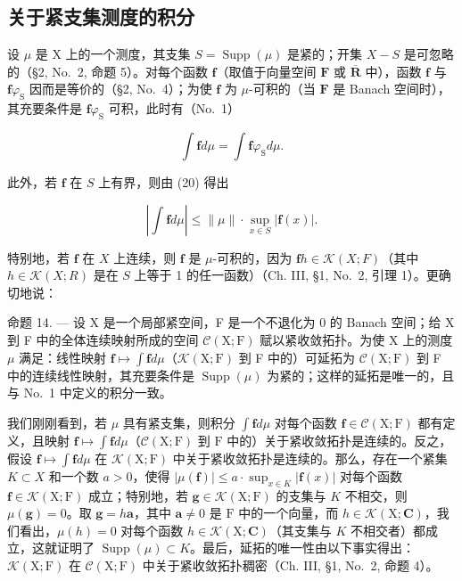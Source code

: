 \subsection{关于紧支集测度的积分}

设 \(\mu\) 是 X 上的一个测度，其支集 \(S = \operatorname{Supp}(\mu)\) 是紧的；开集 \(X - S\) 是可忽略的（§2, No.~2, 命题 5）。对每个函数 \(\mathbf{f}\)（取值于向量空间 \(\mathbf{F}\) 或 \(\overline{\mathbf{R}}\) 中），函数 \(\mathbf{f}\) 与 \(\mathbf{f}\varphi_{\mathrm{S}}\) 因而是等价的（§2, No.~4）；为使 \(\mathbf{f}\) 为 \(\mu\)-可积的（当 \(\mathbf{F}\) 是 Banach 空间时），其充要条件是 \(\mathbf{f}\varphi_{\mathrm{S}}\) 可积，此时有（No.~1）

\[
\int \mathbf {f} d \mu = \int \mathbf {f} \varphi_ {\mathrm{S}} d \mu .\tag{21}
\]

此外，若 \(\mathbf{f}\) 在 \(S\) 上有界，则由 (20) 得出

\[
\left| \int \mathbf {f} d \mu \right| \leqslant \| \mu \| \cdot \sup _ {x \in S} | \mathbf {f} (x) |.\tag{22}
\]

特别地，若 \(\mathbf{f}\) 在 \(X\) 上连续，则 \(\mathbf{f}\) 是 \(\mu\)-可积的，因为 \(\mathbf{f}h \in \mathcal{K}(X;F)\)（其中 \(h \in \mathcal{K}(X;R)\) 是在 \(S\) 上等于 1 的任一函数）（Ch. III, §1, No.~2, 引理 1）。更确切地说：

命题 14. --- 设 X 是一个局部紧空间，F 是一个不退化为 0 的 Banach 空间；给 X 到 F 中的全体连续映射所成的空间 \(\mathcal{C}(\mathrm{X};\mathrm{F})\) 赋以紧收敛拓扑。为使 X 上的测度 \(\mu\) 满足：线性映射 \(\mathbf{f} \mapsto \int \mathbf{f} d\mu\)（\(\mathcal{K}(\mathrm{X};\mathrm{F})\) 到 F 中的）可延拓为 \(\mathcal{C}(\mathrm{X};\mathrm{F})\) 到 F 中的连续线性映射，其充要条件是 \(\operatorname{Supp}(\mu)\) 为紧的；这样的延拓是唯一的，且与 No.~1 中定义的积分一致。

我们刚刚看到，若 \(\mu\) 具有紧支集，则积分 \(\int \mathbf{f}d\mu\) 对每个函数 \(\mathbf{f}\in \mathcal{C}(\mathrm{X};\mathrm{F})\) 都有定义，且映射 \(\mathbf{f}\mapsto \int \mathbf{f}d\mu\)（\(\mathcal{C}(\mathrm{X};\mathrm{F})\) 到 \(\mathrm{F}\) 中的）关于紧收敛拓扑是连续的。反之，假设 \(\mathbf{f}\mapsto \int \mathbf{f}d\mu\) 在 \(\mathcal{K}(\mathrm{X};\mathrm{F})\) 中关于紧收敛拓扑是连续的。那么，存在一个紧集 \(K\subset X\) 和一个数 \(a > 0\)，使得 \(|\mu (\mathbf{f})|\leqslant a\cdot \sup_{x\in K}|\mathbf{f}(x)|\) 对每个函数 \(\mathbf{f}\in \mathcal{K}(\mathrm{X};\mathrm{F})\) 成立；特别地，若 \(\mathbf{g}\in \mathcal{K}(\mathrm{X};\mathrm{F})\) 的支集与 \(K\) 不相交，则 \(\mu (\mathbf{g}) = 0\)。取 \(\mathbf{g} = h\mathbf{a}\)，其中 \(\mathbf{a}\neq 0\) 是 \(\mathrm{F}\) 中的一个向量，而 \(h\in \mathcal{K}(\mathrm{X};\mathbf{C})\)，我们看出，\(\mu (h) = 0\) 对每个函数 \(h\in \mathcal{K}(\mathrm{X};\mathbf{C})\)（其支集与 \(K\) 不相交者）都成立，这就证明了 \(\operatorname {Supp}(\mu)\subset K\)。最后，延拓的唯一性由以下事实得出：\(\mathcal{K}(\mathrm{X};\mathrm{F})\) 在 \(\mathcal{C}(\mathrm{X};\mathrm{F})\) 中关于紧收敛拓扑稠密（Ch. III, §1, No.~2, 命题 4）。

